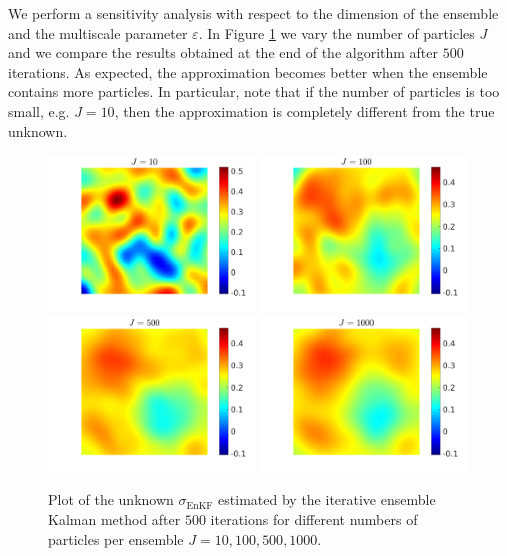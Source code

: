 \documentclass[10pt]{article}
\begin{document}
We perform a sensitivity analysis with respect to the dimension of the ensemble and the multiscale parameter $\varepsilon$. In Figure \ref{fig:comparison_J} we vary the number of particles $J$ and we compare the results obtained at the end of the algorithm after $500$ iterations. As expected, the approximation becomes better when the ensemble contains more particles. In particular, note that if the number of particles is too small, e.g. $J = 10$, then the approximation is completely different from the true unknown.

\begin{figure}[t]
\centering
\includegraphics[width = 0.49\textwidth]{figures/ensemble_500_J10}
\includegraphics[width = 0.49\textwidth]{figures/ensemble_500_J100}
\\
\includegraphics[width = 0.49\textwidth]{figures/ensemble_500_J500}
\includegraphics[width = 0.49\textwidth]{figures/ensemble_500_J1000}
\caption{Plot of the unknown $\sigma_{\mathrm{EnKF}}$ estimated by the iterative ensemble Kalman method after $500$ iterations for different numbers of particles per ensemble $J = 10, 100, 500, 1000$.}
\label{fig:comparison_J}
\end{figure}
\end{document}
